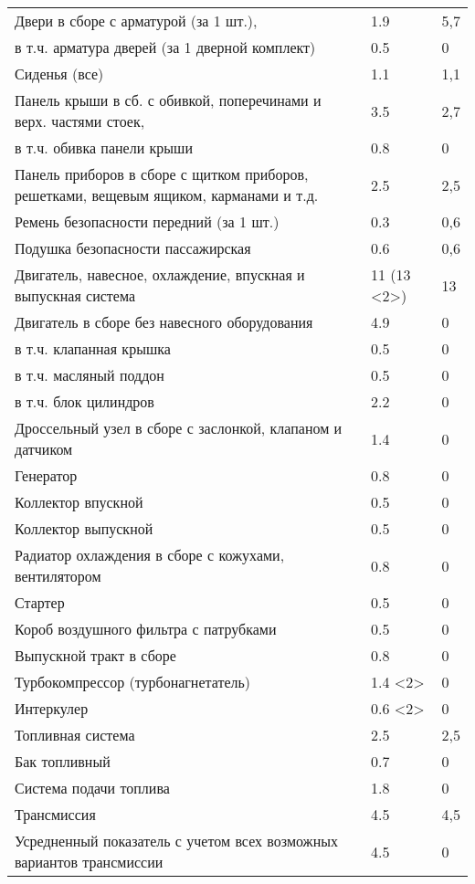 \begin{longtable}{|p{9cm}|p{4cm}|p{2cm}|}
 		Двери в сборе с арматурой (за 1 шт.), & 1.9 & 5,7 \\
 		в т.ч. арматура дверей (за 1    дверной комплект) & 0.5 & 0 \\
 		Сиденья (все) & 1.1 & 1,1 \\
 		Панель крыши в сб. с обивкой, поперечинами и верх. частями стоек, & 3.5 & 2,7 \\
 		в т.ч. обивка панели крыши & 0.8 & 0 \\
 		Панель приборов в сборе с щитком приборов, решетками, вещевым ящиком, карманами и т.д. & 2.5 & 2,5 \\
 		Ремень безопасности передний (за 1 шт.) & 0.3 & 0,6 \\
 		Подушка безопасности пассажирская & 0.6 & 0,6 \\
 		Двигатель, навесное, охлаждение, впускная и выпускная система & 11 (13 \textless{}2\textgreater{}) & 13 \\
 		Двигатель в сборе без навесного оборудования & 4.9 & 0 \\
 		в т.ч. клапанная крышка & 0.5 & 0 \\
 		в т.ч. масляный поддон & 0.5 & 0 \\
 		в т.ч. блок цилиндров & 2.2 & 0 \\
 		Дроссельный узел в сборе с заслонкой, клапаном и датчиком & 1.4 & 0 \\
 		Генератор & 0.8 & 0 \\
 		Коллектор впускной & 0.5 & 0 \\
 		Коллектор выпускной & 0.5 & 0 \\
 		Радиатор охлаждения в сборе с кожухами, вентилятором & 0.8 & 0 \\
 		Стартер & 0.5 & 0 \\
 		Короб воздушного фильтра с патрубками & 0.5 & 0 \\
 		Выпускной тракт в сборе & 0.8 & 0 \\
 		Турбокомпрессор (турбонагнетатель) & 1.4 \textless{}2\textgreater{} & 0 \\
 		Интеркулер & 0.6 \textless{}2\textgreater{} & 0 \\
 		Топливная система & 2.5 & 2,5 \\
 		Бак топливный & 0.7 & 0 \\
 		Система подачи топлива & 1.8 & 0 \\
 		Трансмиссия & 4.5 & 4,5 \\
 		Усредненный показатель с учетом всех возможных вариантов трансмиссии & 4.5 & 0 \\

\end{longtable}
